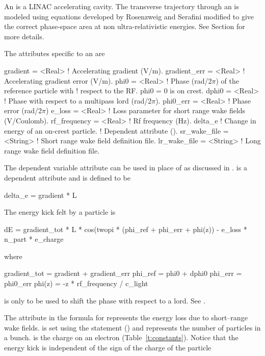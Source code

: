 {{An  is a LINAC accelerating cavity.
The transverse trajectory through an  is modeled using equations
developed by Rosenzweig and Serafini\cite{b:rosenzweig} modified to give the 
correct phase-space area at non ultra-relativistic energies. 
See Section  for more details.

The attributes specific to an  are 
\begin{example}
  gradient     = <Real>   ! Accelerating gradient (V/m).
  gradient_err = <Real>   ! Accelerating gradient error (V/m).
  phi0         = <Real>   ! Phase (rad/2\(\pi\)) of the reference particle with 
                          !   respect to the RF. phi0 = 0 is on crest.
  dphi0        = <Real>   ! Phase with respect to a multipass lord (rad/2\(\pi\)).
  phi0_err     = <Real>   ! Phase error (rad/2\(\pi\))
  e_loss       = <Real>   ! Loss parameter for short range wake fields (V/Coulomb).
  rf_frequency = <Real>   ! Rf frequency (Hz).
  delta_e                 ! Change in energy of an on-crest particle. 
                          !   Dependent attribute ().
  sr_wake_file = <String> ! Short range wake field definition file.
  lr_wake_file = <String> ! Long range wake field definition file.
\end{example}
The dependent variable  attribute can be used in place of
 as discussed in .   is a
dependent attribute and is defined to be
\begin{example}
  delta_e = gradient * L
\end{example}

The energy kick felt by a particle is 
\begin{example}
  dE = gradient_tot * L * cos(twopi * (phi_ref + phi_err + phi(z)) - 
                                                     e_loss * n_part * e_charge 
\end{example}
where
\begin{example}
  gradient_tot = gradient + gradient_err
  phi_ref = phi0 + dphi0
  phi_err = phi0_err
  phi(z) = -z * rf_frequency / c_light
\end{example}
 is only to be used to shift the phase with respect to a 
lord. See .

The  attribute in the formula for  represents the
energy loss due to short--range wake fields.  is set using
the  statement () and represents the
number of particles in a bunch.  is the charge on an
electron (Table~\ref{t:constants}). Notice that the energy kick is
independent of the sign of the charge of the particle

}}
